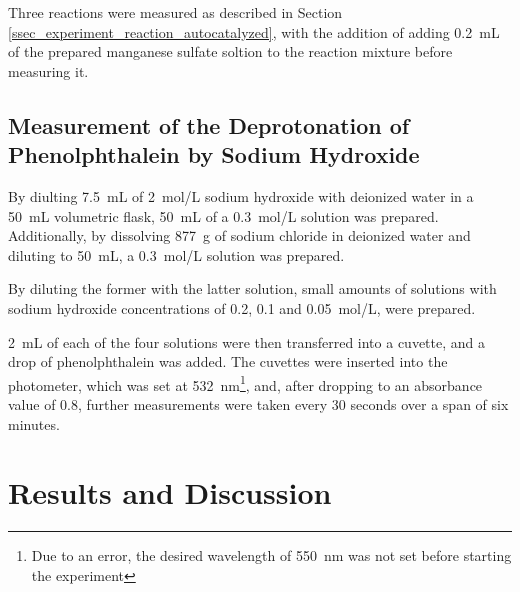 \documentclass[titlepage]{article}
\begin{document}
Three reactions were measured as described in Section \ref{ssec_experiment_reaction_autocatalyzed}, with the addition of adding 0.2~mL of the prepared manganese sulfate soltion to the reaction mixture before measuring it.

\subsection{Measurement of the Deprotonation of Phenolphthalein by Sodium Hydroxide}
By diulting 7.5~mL of 2~mol/L sodium hydroxide with deionized water in a 50~mL volumetric flask, 50~mL of a 0.3~mol/L solution was prepared. Additionally, by dissolving 877~g of sodium chloride in deionized water and diluting to 50~mL, a 0.3~mol/L solution was prepared.

By diluting the former with the latter solution, small amounts of solutions with sodium hydroxide concentrations of 0.2, 0.1 and 0.05~mol/L, were prepared.

2~mL of each of the four solutions were then transferred into a cuvette, and a drop of phenolphthalein was added. The cuvettes were inserted into the photometer, which was set at 532~nm\footnote{Due to an error, the desired wavelength of 550~nm was not set before starting the experiment}, and, after dropping to an absorbance value of 0.8, further measurements were taken every 30 seconds over a span of six minutes.

\newpage
\section{Results and Discussion}


\end{document}
